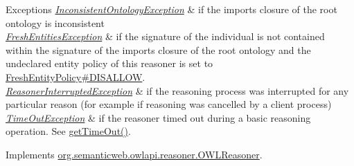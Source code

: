\begin{DoxyExceptions}{Exceptions}
{\em \hyperlink{classorg_1_1semanticweb_1_1owlapi_1_1reasoner_1_1_inconsistent_ontology_exception}{Inconsistent\-Ontology\-Exception}} & if the imports closure of the root ontology is inconsistent \\
\hline
{\em \hyperlink{classorg_1_1semanticweb_1_1owlapi_1_1reasoner_1_1_fresh_entities_exception}{Fresh\-Entities\-Exception}} & if the signature of the individual is not contained within the signature of the imports closure of the root ontology and the undeclared entity policy of this reasoner is set to \hyperlink{enumorg_1_1semanticweb_1_1owlapi_1_1reasoner_1_1_fresh_entity_policy_a762eae6d5b2449d125311ecaabfdc8d0}{Fresh\-Entity\-Policy\#\-D\-I\-S\-A\-L\-L\-O\-W}. \\
\hline
{\em \hyperlink{classorg_1_1semanticweb_1_1owlapi_1_1reasoner_1_1_reasoner_interrupted_exception}{Reasoner\-Interrupted\-Exception}} & if the reasoning process was interrupted for any particular reason (for example if reasoning was cancelled by a client process) \\
\hline
{\em \hyperlink{classorg_1_1semanticweb_1_1owlapi_1_1reasoner_1_1_time_out_exception}{Time\-Out\-Exception}} & if the reasoner timed out during a basic reasoning operation. See \hyperlink{classorg_1_1semanticweb_1_1owlapi_1_1reasoner_1_1impl_1_1_o_w_l_reasoner_base_af55342eaaabb1b72dacfde7a181b93d2}{get\-Time\-Out()}. \\
\hline
\end{DoxyExceptions}


Implements \hyperlink{interfaceorg_1_1semanticweb_1_1owlapi_1_1reasoner_1_1_o_w_l_reasoner_a48613c6f3b6fe46a06555ab98678d8cd}{org.\-semanticweb.\-owlapi.\-reasoner.\-O\-W\-L\-Reasoner}.

